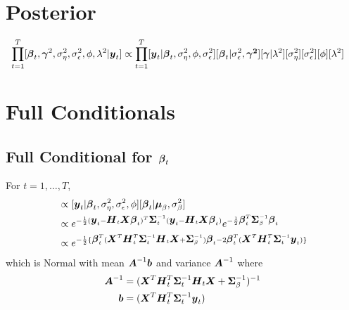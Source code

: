 \documentclass[fleqn]{article}
\def\bm#1{\mbox{\boldmath $#1$}}
\begin{document}
\section{Posterior}
%
\begin{align*}
\prod_{t = 1}^T [\bm{\beta}_t, \bm{\gamma}^2, \sigma^2_\eta, \sigma^2_\epsilon, \phi, \lambda^2 | \bm{y}_t] & \propto \prod_{t = 1}^T [\bm{y}_t | \bm{\beta}_t, \sigma^2_\eta, \phi, \sigma^2_\epsilon] [\bm{\beta}_t | \sigma^2_\epsilon, \bm{\gamma^2}] [\bm{\gamma} | \lambda^2] [\sigma^2_\eta] [\sigma^2_\epsilon] [\phi] [\lambda^2]
\end{align*}
%
\section{Full Conditionals}
%
\subsection{Full Conditional for $\bm{\beta}_t$}
%
For $t = 1, \ldots, T$,
\begin{align*}
[\bm{\beta}_t | \cdot] & \propto [\bm{y}_t | \bm{\beta}_t, \sigma^2_\eta, \sigma^2_\epsilon, \phi] [\bm{\beta}_t | \bm{\mu}_\beta, \sigma^2_\beta]\\
%
& \propto e^{ - \frac{1} {2} (\bm{y}_t - \bm{H}_t \bm{X} \bm{\beta}_t)^T \bm{\Sigma}_t^{ - 1} (\bm{y}_t - \bm{H}_t \bm{X} \bm{\beta}_t)} e^{ - \frac{1} {2} \bm{\beta}_t^T \bm{\Sigma}_\beta^{ - 1} \bm{\beta}_t}\\
%
& \propto e^{ - \frac{1} {2} \{\bm{\beta}_t^T (\bm{X}^T \bm{H}_t^T \bm{\Sigma}_t^{ - 1} \bm{H}_t \bm{X} + \bm{\Sigma}_\beta^{ - 1}) \bm{\beta}_t - 2 \bm{\beta}_t^T (\bm{X}^T \bm{H}_t^T \bm{\Sigma}_t^{ - 1} \bm{y}_t) \} }
\end{align*}
%
which is Normal with mean $ \bm{A}^{ - 1} \bm{b}$ and variance $\bm{A}^{ - 1}$ where
\begin{align*}
  \bm{A}^{ - 1} & = (\bm{X}^T \bm{H}_t^T \bm{\Sigma}_t^{ - 1} \bm{H}_t \bm{X} + \bm{\Sigma}_\beta^{ - 1})^{ - 1}\\
  \bm{b} & = (\bm{X}^T \bm{H}_t^T \bm{\Sigma}_t^{ - 1} \bm{y}_t)\\
\end{align*}
%
\end{document}
